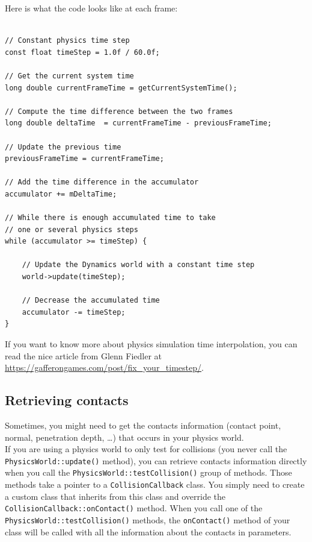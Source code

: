 \documentclass[a4paper,12pt]{article}
\begin{document}
    Here is what the code looks like at each frame: \\

    \begin{lstlisting}

// Constant physics time step
const float timeStep = 1.0f / 60.0f;

// Get the current system time
long double currentFrameTime = getCurrentSystemTime();

// Compute the time difference between the two frames
long double deltaTime  = currentFrameTime - previousFrameTime;

// Update the previous time
previousFrameTime = currentFrameTime;

// Add the time difference in the accumulator
accumulator += mDeltaTime;

// While there is enough accumulated time to take
// one or several physics steps
while (accumulator >= timeStep) {

    // Update the Dynamics world with a constant time step
    world->update(timeStep);

    // Decrease the accumulated time
    accumulator -= timeStep;
}

    \end{lstlisting}

    \vspace{0.6cm}

    If you want to know more about physics simulation time interpolation, you can read the nice article from Glenn Fiedler
    at \url{https://gafferongames.com/post/fix_your_timestep/}.

    \subsection{Retrieving contacts}

    Sometimes, you might need to get the contacts information (contact point, normal, penetration depth, \dots) that occurs in your physics world. \\

    If you are using a physics world to only test for collisions (you never call the \texttt{PhysicsWorld::update()} method), you can retrieve contacts
    information directly when you call the \texttt{PhysicsWorld::testCollision()} group of methods. Those methods take a pointer to a
    \texttt{CollisionCallback} class. You simply need to create a custom class that inherits from this class and override the
    \texttt{CollisionCallback::onContact()} method. When you call one of the \texttt{PhysicsWorld::testCollision()} methods, the \texttt{onContact()} method
    of your class will be called with all the information about the contacts in parameters. \\
\end{document}
